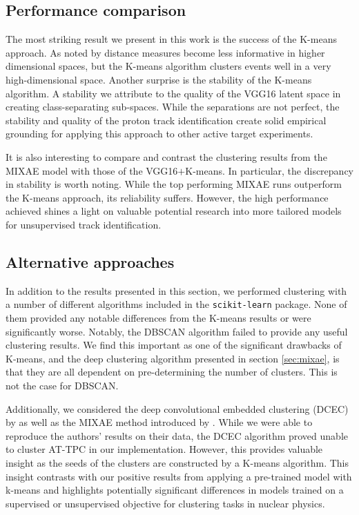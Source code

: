 \documentclass[review,number,sort&compress]{elsarticle}
\begin{document}
\subsection{Performance comparison}

The most striking result we present in this work is the success of the K-means approach. As noted by \cite{Aggarwal} distance measures become less informative in higher dimensional spaces, but the K-means algorithm clusters events well in a very high-dimensional space.
Another surprise is the stability of the K-means algorithm. A stability we attribute to the quality of the VGG16 latent space in creating class-separating sub-spaces. While the separations are not perfect, the stability and quality of the proton track identification create solid empirical grounding for applying this approach to other active target experiments. 


It is also interesting to compare and contrast the clustering results from the MIXAE model with those of the VGG16$+$K-means. In particular, the discrepancy in stability is worth noting. While the top performing MIXAE runs outperform the K-means approach, its reliability suffers. However, the high performance achieved shines a light on valuable potential research into more tailored models for unsupervised track identification.


\subsection{Alternative approaches}

In addition to the results presented in this section, we performed clustering with a number of different algorithms included in the \lstinline{scikit-learn} package. None of them provided any notable differences from the K-means results or were significantly worse. Notably, the DBSCAN algorithm \cite{Ester96adensity-based}\cite{Bergstra2012} failed to provide any useful clustering results. We find this important as one of the significant drawbacks of K-means, and the deep clustering algorithm presented in section \ref{sec:mixae}, is that they are all dependent on pre-determining the number of clusters. This is not the case for DBSCAN. 

Additionally, we considered the deep convolutional embedded clustering (DCEC) by \citet{Guo2017} as well as the MIXAE method introduced by \citet{Zhang}. While we were able to reproduce the authors' results on their data, the DCEC algorithm proved unable to cluster AT-TPC in our implementation. However, this provides valuable insight as the seeds of the clusters are constructed by a K-means algorithm. This insight contrasts with our positive results from applying a pre-trained model with k-means and highlights potentially significant differences in models trained on a supervised or unsupervised objective for clustering tasks in nuclear physics. 
\end{document}
